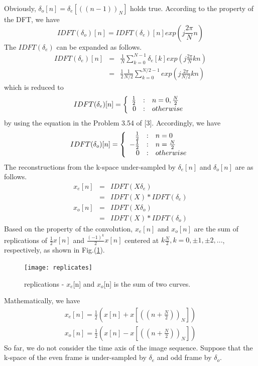 \documentclass[12pt,a4paper]{article}
\begin{document}
\begin{CJK}{UTF8}{songti}
Obviously, $\delta_{o}[n]=\delta_{e}[((n-1))_N]$ holds true. According to the property of the DFT, we have 
\begin{equation}
IDFT(\delta_{o})[n]=IDFT(\delta_{e})[n]exp(j\frac{2 \pi}{N}n)
\end{equation}
The $IDFT(\delta_{e})$ can be expanded as follows.
\begin{eqnarray}
IDFT(\delta_{e})[n] & = & \frac{1}{N}\sum_{k=0}^{N-1}\delta_{e}[k]exp(j\frac{2 \pi}{N} kn) \nonumber\\
                    & = & \frac{1}{2}\frac{1}{N/2}\sum_{k=0}^{N/2-1}exp(j\frac{2 \pi}{N/2} kn)
\end{eqnarray}
which is reduced to 
\begin{equation} 
IDFT(\delta_{e})[n] = 
\left\{ 
      \begin{array} 
      {r@{\quad:\quad}l}
      \frac{1}{2} & n = 0, \frac{N}{2} \\
      0           & otherwise
      \end{array}
\right.
\end{equation}
by using the equation in the Problem 3.54 of [3]. Accordingly, we have
\begin{equation}
IDFT(\delta_{o})[n]=
\left\{ 
      \begin{array} 
      {r@{\quad:\quad}l}
       \frac{1}{2} & n = 0 \\
      -\frac{1}{2} & n = \frac{N}{2} \\
       0           & otherwise
      \end{array}
\right.
\end{equation}
The reconstructions from the k-space under-sampled by $\delta_{e}[n]$ and $\delta_{o}[n]$ are as follows.
\begin{eqnarray}
x_{e}[n] & = & IDFT(X\delta_{e}) \nonumber\\
         & = & IDFT(X)*IDFT(\delta_{e})
\end{eqnarray}
\begin{eqnarray}
x_{o}[n] & = & IDFT(X\delta_{o}) \nonumber\\
         & = & IDFT(X)*IDFT(\delta_{o})
\end{eqnarray}
Based on the property of the convolution, $x_{e}[n]$ and $x_{o}[n]$ are the sum of replications of $\frac{1}{2}x[n]$ and $\frac{(-1)^{k}}{2}x[n]$ centered at $k \frac{N}{2}, k=0, \pm1, \pm2, ...$, respectively, as shown in Fig.(\ref{replications}).
\begin{figure}
\centering
\texttt{[image: replicates]}
\caption{replications - $x_e$[n] and $x_o$[n] is the sum of two curves.}
\label{replications}
\end{figure} 
Mathematically, we have
\begin{eqnarray}
x_{e}[n]=\frac{1}{2}(x[n]+x[((n+\frac{N}{2}))_N]) \\
x_{o}[n]=\frac{1}{2}(x[n]-x[((n+\frac{N}{2}))_N])
\end{eqnarray}
So far, we do not consider the time axis of the image sequence. Suppose that the k-space of the even frame is under-sampled by $\delta_{e}$ and odd frame by $\delta_{o}$. 


\end{CJK}
\end{document}
